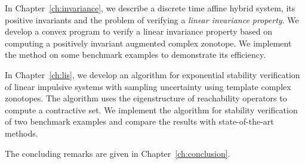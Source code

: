 In Chapter~\ref{ch:invariance}, we describe a discrete time affine
hybrid system, its positive invariants and the problem of verifying a
\emph{linear invariance property}.  We develop a convex program to
verify a linear invariance property based on computing a positively
invariant augmented complex zonotope.  We implement the method on
some benchmark examples to demonstrate its efficiency.

In Chapter~\ref{ch:lis}, we develop an algorithm for exponential
stability verification of linear impulsive systems with sampling
uncertainty using template complex zonotopes.  The algorithm uses the
eigenstructure of reachability operators to compute a contractive set.
We implement the algorithm for stability verification of two benchmark
examples and compare the results with state-of-the-art methods.

The concluding remarks are given in Chapter~\ref{ch:conclusion}.


